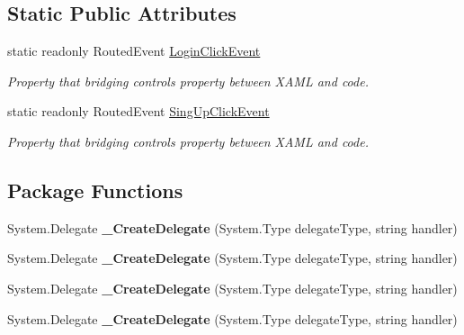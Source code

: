 \subsection*{Static Public Attributes}
\begin{DoxyCompactItemize}
\item 
static readonly Routed\+Event \mbox{\hyperlink{class_wpf_handler_1_1_u_i_1_1_controls_1_1_logon_1_1_logon_panel_ab9613de0d505e18492f27e6a724d5f15}{Login\+Click\+Event}}
\begin{DoxyCompactList}\small\item\em Property that bridging control\textquotesingle{}s property between X\+A\+ML and code. \end{DoxyCompactList}\item 
static readonly Routed\+Event \mbox{\hyperlink{class_wpf_handler_1_1_u_i_1_1_controls_1_1_logon_1_1_logon_panel_a4cf4484559bf3452fc12775eaa6320f8}{Sing\+Up\+Click\+Event}}
\begin{DoxyCompactList}\small\item\em Property that bridging control\textquotesingle{}s property between X\+A\+ML and code. \end{DoxyCompactList}\end{DoxyCompactItemize}
\subsection*{Package Functions}
\begin{DoxyCompactItemize}
\item 
\mbox{\label{class_wpf_handler_1_1_u_i_1_1_controls_1_1_logon_1_1_logon_panel_a647f73a59562525754889c5403b031b0}} 
System.\+Delegate {\bfseries \+\_\+\+Create\+Delegate} (System.\+Type delegate\+Type, string handler)
\item 
\mbox{\label{class_wpf_handler_1_1_u_i_1_1_controls_1_1_logon_1_1_logon_panel_a647f73a59562525754889c5403b031b0}} 
System.\+Delegate {\bfseries \+\_\+\+Create\+Delegate} (System.\+Type delegate\+Type, string handler)
\item 
\mbox{\label{class_wpf_handler_1_1_u_i_1_1_controls_1_1_logon_1_1_logon_panel_a647f73a59562525754889c5403b031b0}} 
System.\+Delegate {\bfseries \+\_\+\+Create\+Delegate} (System.\+Type delegate\+Type, string handler)
\item 
\mbox{\label{class_wpf_handler_1_1_u_i_1_1_controls_1_1_logon_1_1_logon_panel_a647f73a59562525754889c5403b031b0}} 
System.\+Delegate {\bfseries \+\_\+\+Create\+Delegate} (System.\+Type delegate\+Type, string handler)
\end{DoxyCompactItemize}
